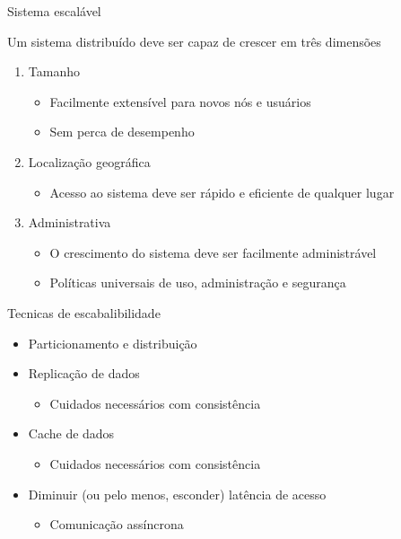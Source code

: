 \documentclass[compress]{beamer}
\begin{document}

\begin{frame}{Sistema escalável}

Um sistema distribuído deve ser capaz de crescer em três dimensões
\begin{enumerate}
    \item Tamanho
    \begin{itemize}
        \item Facilmente extensível para novos nós e usuários
        \item Sem perca de desempenho
    \end{itemize}
    \item Localização geográfica
    \begin{itemize}
        \item Acesso ao sistema deve ser rápido e eficiente de qualquer lugar
    \end{itemize}
    \item Administrativa
    \begin{itemize}
        \item O crescimento do sistema deve ser facilmente administrável
        \item Políticas universais de uso, administração e segurança
    \end{itemize}
\end{enumerate}

\end{frame}


\begin{frame}{Tecnicas de escabalibilidade}


\begin{itemize}
    \item Particionamento e distribuição
    \item Replicação de dados
    \begin{itemize}
        \item Cuidados necessários com consistência
    \end{itemize}
    \item Cache de dados
    \begin{itemize}
        \item Cuidados necessários com consistência
    \end{itemize}
    \item Diminuir (ou pelo menos, esconder) latência de acesso
    \begin{itemize}
        \item Comunicação assíncrona
    \end{itemize}
\end{itemize}


\end{frame}
\end{document}
